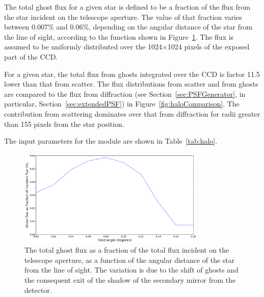 \documentclass[11pt]{article}      %
\begin{document}
The total ghost flux for a given star is defined to be a fraction of the flux from the star incident on the telescope aperture. The value of that fraction varies between 0.007\% and 0.06\%, depending on the angular distance of the star from the line of sight, according to the function shown in Figure~\ref{fig:ghostFluxFraction}. The flux is assumed to be uniformly distributed over the 1024$\times$1024 pixels of the exposed part of the CCD.

For a given star, the total flux from ghosts integrated over the CCD is factor 11.5 lower than that from scatter. The flux distributions from scatter and from ghosts are compared to the flux from diffraction (see Section~\ref{sec:PSFGenerator}, in particular, Section~\ref{sec:extendedPSF}) in Figure~\ref{fig:haloComparison}. The contribution from scattering dominates over that from diffraction for radii greater than 155 pixels from the star position.

The input parameters for the module are shown in Table~\ref{tab:halo}.

\begin{figure}[htbp]
  \begin{center}
    \includegraphics[width=0.8\textwidth]{ghostFluxFraction.png}
    \caption{The total ghost flux as a fraction of the total flux incident on the telescope aperture, as a function of the angular distance of the star from the line of sight. The variation is due to the shift of ghosts and the consequent exit of the shadow of the secondary mirror from the detector.}
    \label{fig:ghostFluxFraction}
  \end{center}
\end{figure}
\end{document}
